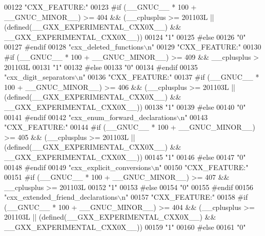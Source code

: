 \begin{DoxyCode}
00122 \textcolor{stringliteral}{"CXX\_FEATURE:"}
00123 \textcolor{preprocessor}{#if (\_\_GNUC\_\_ * 100 + \_\_GNUC\_MINOR\_\_) >= 404 && (\_\_cplusplus >= 201103L ||
       (defined(\_\_GXX\_EXPERIMENTAL\_CXX0X\_\_) && \_\_GXX\_EXPERIMENTAL\_CXX0X\_\_))}
00124 \textcolor{stringliteral}{"1"}
00125 \textcolor{preprocessor}{#else}
00126 \textcolor{stringliteral}{"0"}
00127 \textcolor{preprocessor}{#endif}
00128 \textcolor{stringliteral}{"cxx\_deleted\_functions\(\backslash\)n"}
00129 \textcolor{stringliteral}{"CXX\_FEATURE:"}
00130 \textcolor{preprocessor}{#if (\_\_GNUC\_\_ * 100 + \_\_GNUC\_MINOR\_\_) >= 409 && \_\_cplusplus > 201103L}
00131 \textcolor{stringliteral}{"1"}
00132 \textcolor{preprocessor}{#else}
00133 \textcolor{stringliteral}{"0"}
00134 \textcolor{preprocessor}{#endif}
00135 \textcolor{stringliteral}{"cxx\_digit\_separators\(\backslash\)n"}
00136 \textcolor{stringliteral}{"CXX\_FEATURE:"}
00137 \textcolor{preprocessor}{#if (\_\_GNUC\_\_ * 100 + \_\_GNUC\_MINOR\_\_) >= 406 && (\_\_cplusplus >= 201103L ||
       (defined(\_\_GXX\_EXPERIMENTAL\_CXX0X\_\_) && \_\_GXX\_EXPERIMENTAL\_CXX0X\_\_))}
00138 \textcolor{stringliteral}{"1"}
00139 \textcolor{preprocessor}{#else}
00140 \textcolor{stringliteral}{"0"}
00141 \textcolor{preprocessor}{#endif}
00142 \textcolor{stringliteral}{"cxx\_enum\_forward\_declarations\(\backslash\)n"}
00143 \textcolor{stringliteral}{"CXX\_FEATURE:"}
00144 \textcolor{preprocessor}{#if (\_\_GNUC\_\_ * 100 + \_\_GNUC\_MINOR\_\_) >= 405 && (\_\_cplusplus >= 201103L ||
       (defined(\_\_GXX\_EXPERIMENTAL\_CXX0X\_\_) && \_\_GXX\_EXPERIMENTAL\_CXX0X\_\_))}
00145 \textcolor{stringliteral}{"1"}
00146 \textcolor{preprocessor}{#else}
00147 \textcolor{stringliteral}{"0"}
00148 \textcolor{preprocessor}{#endif}
00149 \textcolor{stringliteral}{"cxx\_explicit\_conversions\(\backslash\)n"}
00150 \textcolor{stringliteral}{"CXX\_FEATURE:"}
00151 \textcolor{preprocessor}{#if (\_\_GNUC\_\_ * 100 + \_\_GNUC\_MINOR\_\_) >= 407 && \_\_cplusplus >= 201103L}
00152 \textcolor{stringliteral}{"1"}
00153 \textcolor{preprocessor}{#else}
00154 \textcolor{stringliteral}{"0"}
00155 \textcolor{preprocessor}{#endif}
00156 \textcolor{stringliteral}{"cxx\_extended\_friend\_declarations\(\backslash\)n"}
00157 \textcolor{stringliteral}{"CXX\_FEATURE:"}
00158 \textcolor{preprocessor}{#if (\_\_GNUC\_\_ * 100 + \_\_GNUC\_MINOR\_\_) >= 404 && (\_\_cplusplus >= 201103L ||
       (defined(\_\_GXX\_EXPERIMENTAL\_CXX0X\_\_) && \_\_GXX\_EXPERIMENTAL\_CXX0X\_\_))}
00159 \textcolor{stringliteral}{"1"}
00160 \textcolor{preprocessor}{#else}
00161 \textcolor{stringliteral}{"0"}

\end{DoxyCode}
